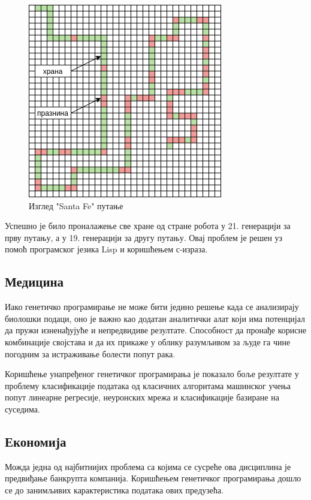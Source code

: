 \documentclass[a4paper]{article}
\begin{document}
\begin{figure}[h!]
    \begin{center}
        \includegraphics[scale=0.55]{santa_fe.png}
    \end{center}
    \caption{Изглед "Santa Fe" путање}
    \label{fig:santa_fe}
\end{figure}

Успешно је било проналажење све хране од стране робота у 21. генерацији за прву путању, а у 19. генерацији за другу путању. \cite{robo2} Овај проблем је решен уз помоћ програмског језика Lisp и коришћењем с-израза. \cite{lisp}
\subsection{Медицина}
Иако генетичко програмирање не може бити једино решење када се анализирају биолошки подаци, оно је важно као додатан аналитички алат који има потенцијал да пружи изненађујуће и непредвидиве резултате. Способност да пронађе корисне комбинације својстава и да их прикаже у облику разумљивом за људе га чине погодним за истраживање болести попут рака. \cite{cancer}

Коришћење унапређеног генетичког програмирања је показало боље резултате у проблему класификације података од класичних алгоритама машинског учења попут линеарне регресије, неуронских мрежа и класификације базиране на суседима. \cite{egp}
\subsection{Економија}
Можда једна од најбитнијих проблема са којима се сусреће ова дисциплина је предвиђање банкрупта компанија. Коришћењем генетичког програмирања дошло се до занимљивих карактеристика података ових предузећа. \cite{bankruptcy}
\end{document}
